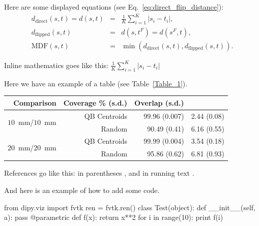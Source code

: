 \documentclass{bioinfo}
\begin{document}
Here are some displayed equations (see Eq.~\ref{eq:direct_flip_distance}):
\begin{eqnarray}
  d_{\textrm{direct}}(s, t) = d(s, t) & = & \frac{1}{K}\sum_{i=1}^{K}|s_{i}-t_{i}|,\nonumber\\
  d_{\textrm{flipped}}(s, t) & = & d(s,t^F) = d(s^F,t),\nonumber\\
  \textrm{MDF}(s, t) & = & \min(d_{\textrm{direct}}(s, t), d_{\textrm{flipped}}(s, t))\label{eq:direct_flip_distance}.
\end{eqnarray}

Inline mathematics goes like this: $\frac{1}{K}\sum_{i=1}^{K}|s_{i}-t_{i}|$

Here we have an example of a table (see Table~\ref{Table_1}).

\begin{table}[th]  {\begin{tabular}{rrrr} %
Comparison & Coverage \% (s.d.) & Overlap (s.d.) \\ \hline
\multirow{2}{*}{$10$~mm/$10$~mm} & QB Centroids & 99.96 (0.007) & 2.44
(0.08)\\ & Random & 90.49 (0.41) & 6.16 (0.55)\\ \hline
\multirow{2}{*}{$20$~mm/$20$~mm} & QB Centroids & 99.99 (0.004) & 3.54
(0.18)\\ & Random & 95.86 (0.62) & 6.81 (0.93)\\ \hline
\end{tabular}}{}
\end{table}

References go like this: in parentheses \citep{Garyfallidis_thesis, Mori1999}, and in running text \citet{Garyfallidis_thesis}.

And here is an example of how to add some code.

\begin{python}
from dipy.viz import fvtk
ren = fvtk.ren()
class Test(object):
  def __init__(self, a):
    pass
@parametric
def f(x):
  return x**2
for i in range(10):
  print f(i)
\end{python}


%

%
%
%
%

\end{document}
